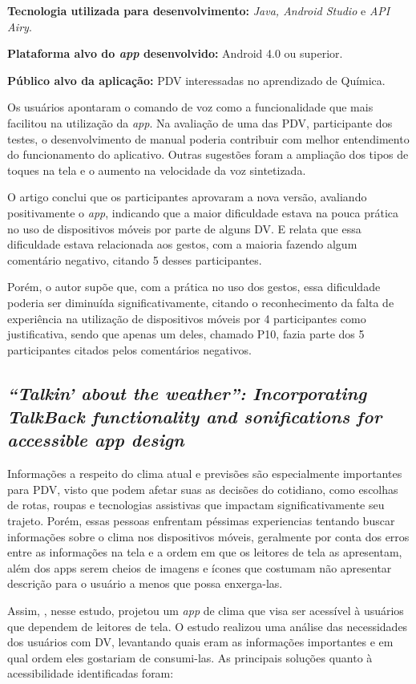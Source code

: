 \textbf{Tecnologia utilizada para desenvolvimento:} \emph{Java, Android Studio} e \emph{API Airy}.

\textbf{Plataforma alvo do \emph{app} desenvolvido:} Android 4.0 ou superior.

\textbf{Público alvo da aplicação:} PDV interessadas no aprendizado de Química\@.

Os usuários apontaram o comando de voz como a funcionalidade que mais facilitou na utilização da \emph{app}.
Na avaliação de uma das PDV, participante dos testes, o desenvolvimento de manual poderia contribuir com melhor entendimento do funcionamento do aplicativo.
Outras sugestões foram a ampliação dos tipos de toques na tela e o aumento na velocidade da voz sintetizada.

O artigo conclui que os participantes aprovaram a nova versão, avaliando positivamente o \emph{app}, indicando que a maior dificuldade estava na pouca prática no uso de dispositivos móveis por parte de alguns DV\@.
E relata que essa dificuldade estava relacionada aos gestos, com a maioria fazendo algum comentário negativo, citando 5 desses participantes.

Porém, o autor supõe que, com a prática no uso dos gestos, essa dificuldade poderia ser diminuída significativamente, citando o reconhecimento da falta de experiência na utilização de dispositivos móveis por 4 participantes como justificativa, sendo que apenas um deles, chamado P10, fazia parte dos 5 participantes citados pelos comentários negativos.

\subsection{\emph{``Talkin' about the weather'': Incorporating TalkBack functionality and sonifications for accessible app design}}

Informações a respeito do clima atual e previsões são especialmente importantes para PDV, visto que podem afetar suas as decisões do cotidiano, como escolhas de rotas, roupas e tecnologias assistivas que impactam significativamente seu trajeto.
Porém, essas pessoas enfrentam péssimas experiencias tentando buscar informações sobre o clima nos dispositivos móveis, geralmente por conta dos erros entre as informações na tela e a ordem em que os leitores de tela as apresentam, além dos apps serem cheios de imagens e ícones que costumam não apresentar descrição para o usuário a menos que possa enxerga-las.

Assim, , nesse estudo, projetou um \emph{app} de clima que visa ser acessível à usuários que dependem de leitores de tela.
O estudo realizou uma análise das necessidades dos usuários com DV, levantando quais eram as informações importantes e em qual ordem eles gostariam de consumi-las.
As principais soluções quanto à acessibilidade identificadas foram:

